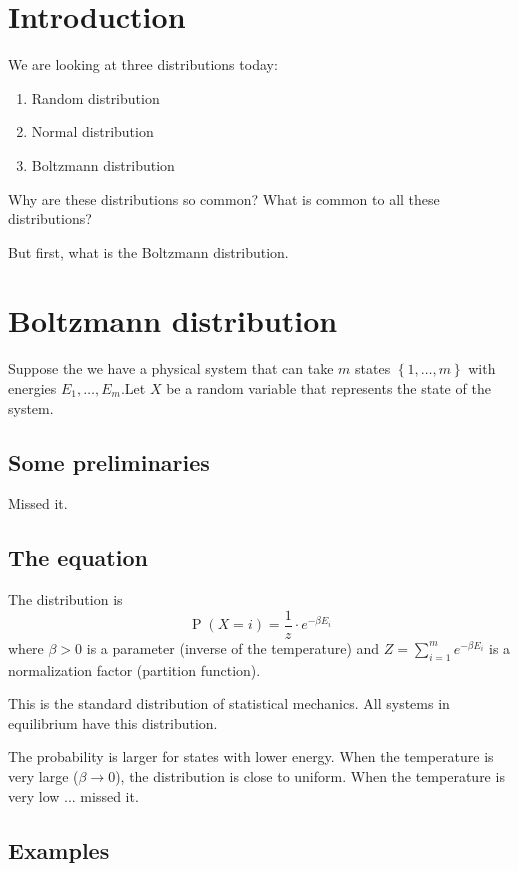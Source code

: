 \documentclass{article}
\begin{document}
\section{Introduction}
We are looking at three distributions today:
\begin{enumerate}
    \item Random distribution
    \item Normal distribution
    \item Boltzmann distribution
\end{enumerate}
Why are these distributions so common? What is common to all these distributions?

But first, what is the Boltzmann distribution.

\section{Boltzmann distribution}

Suppose the we have a physical system that can take $m$ states $\left\{1,\ldots,m\right\}$ with energies $E_1,\ldots,E_m$.Let $X$ be a random variable that represents the state of the system.

\subsection{Some preliminaries}

Missed it.

\subsection{The equation}

The distribution is 
\[
\operatorname{P}\left(X=i\right) = \frac{1}{z}\cdot e^{-\beta E_i}
\]
where $\beta >0$ is a parameter (inverse of the temperature) and $Z=\sum_{i=1 }^{m }e^{-\beta E_i}$ is a normalization factor (partition function).

This is the standard distribution of statistical mechanics. All systems in equilibrium have this distribution.

The probability is larger for states with lower energy. When the temperature is very large ($\beta\to 0$), the distribution is close to uniform. When the temperature is very low ... missed it.

\subsection{Examples}
\end{document}
